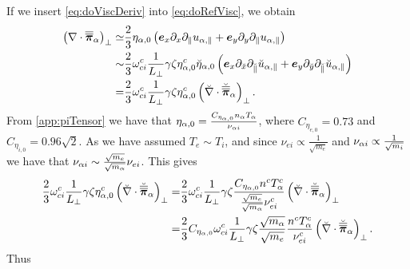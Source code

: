 %
If we insert \cref{eq:doViscDeriv} into \cref{eq:doRefVisc}, we obtain
%
\begin{align*}
 \left(\nabla\cdot\boldsymbol{\overline{\overline{\pi}}}_\alpha\right)_\perp \simeq&
 \frac{2}{3}\eta_{\alpha,0}
 \left(
  \boldsymbol{e}_x\partial_x\partial_\|u_{\alpha,\|}
  +
  \boldsymbol{e}_y\partial_y\partial_\|u_{\alpha,\|}
 \right)
 \\
 \sim&
 \frac{2}{3}
  \omega^c_{ci}
  \frac{1}{L_\perp}
  \gamma
  \zeta
  \eta^c_{\alpha,0}
  \breve{\eta}_{\alpha,0}
 \left(
  \boldsymbol{e}_x\partial_{\breve{x}}\partial_{\breve{\|}}\breve{u}_{\alpha,\|} +
  \boldsymbol{e}_y\partial_{\breve{y}}\partial_{\breve{\|}}\breve{u}_{\alpha,\|}
 \right)
 \\
 =&
 \frac{2}{3}
  \omega^c_{ci}
  \frac{1}{L_\perp}
  \gamma
  \zeta
  \eta^c_{\alpha,0}
 \left(\breve{\nabla}\cdot\breve{\boldsymbol{\overline{\overline{\pi}}}}_\alpha\right)_\perp.
\end{align*}
%
From \cref{app:piTensor} we have that $\eta_{\alpha,0}=\frac{C_{\eta_{\alpha,0}}n_\alpha T_\alpha}{\nu_{\alpha i}}$, where $C_{\eta_{e,0}}=0.73$ and $C_{\eta_{i,0}}=0.96\sqrt{2}$.
As we have assumed $T_e \sim T_i$, and since $\nu_{e i}\propto \frac{1}{\sqrt{m_e}}$ and $\nu_{\alpha i}\propto \frac{1}{\sqrt{m_i}}$ we have that $\nu_{\alpha i}\sim \frac{\sqrt{m_e}}{\sqrt{m_\alpha}}\nu_{ei}$.
This gives
%
\begin{align*}
 \frac{2}{3}
  \omega^c_{ci}
  \frac{1}{L_\perp}
  \gamma
  \zeta
  \eta^c_{\alpha,0}
 \left(\breve{\nabla}\cdot\breve{\boldsymbol{\overline{\overline{\pi}}}}_\alpha\right)_\perp
 =&
 \frac{2}{3}
  \omega^c_{ci}
  \frac{1}{L_\perp}
  \gamma
  \zeta
  \frac{C_{\eta_{\alpha,0}} n^c T^c_\alpha}{\frac{\sqrt{m_e}}{\sqrt{m_\alpha}}\nu^c_{ei}}
 \left(\breve{\nabla}\cdot\breve{\boldsymbol{\overline{\overline{\pi}}}}_\alpha\right)_\perp
 \\
 =&
 \frac{2}{3}
 C_{\eta_{\alpha,0}}
  \omega^c_{ci}
  \frac{1}{L_\perp}
  \gamma
  \zeta
  \frac{\sqrt{m_\alpha}}{\sqrt{m_e}}
  \frac{n^c T^c_\alpha}{\nu^c_{ei}}
 \left(\breve{\nabla}\cdot\breve{\boldsymbol{\overline{\overline{\pi}}}}_\alpha\right)_\perp.
\end{align*}
%
Thus
%
